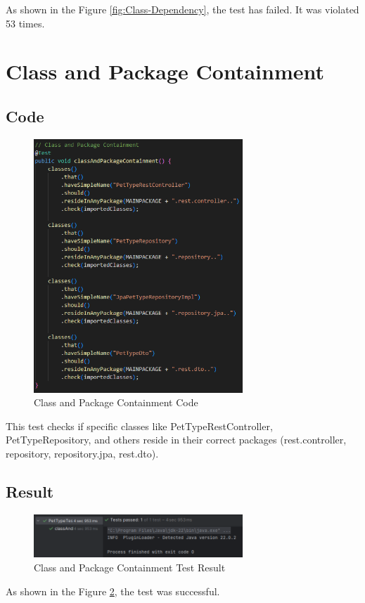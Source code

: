 \documentclass[a4paper,11pt,openright,BCOR=15mm]{scrbook}
\begin{document}
	As shown in the Figure \ref{fig:Class-Dependency}, the test has failed. It was violated 53 times.
	
	
	
	\section{Class and Package Containment}
	\subsection{Code}
	\begin{figure}[H]
		\centering
		\includegraphics[width=0.7\textwidth]{figs/Architectural Compliance/Class and Package Code.png}
		\caption{Class and Package Containment Code}
		\label{fig:Class-and-Package-Containment-Code}
	\end{figure}
	This test checks if specific classes like PetTypeRestController, PetTypeRepository, and others reside in their correct packages (rest.controller, repository, repository.jpa, rest.dto).
	\subsection{Result}
	\begin{figure}[H]
		\centering
		\includegraphics[width=0.7\textwidth]{figs/Architectural Compliance/Class and Package Containment.png}
		\caption{Class and Package Containment Test Result}
		\label{fig:Class-and-Package-Containment}
	\end{figure}
	As shown in the Figure \ref{fig:Class-and-Package-Containment}, the test was successful.
\end{document}
